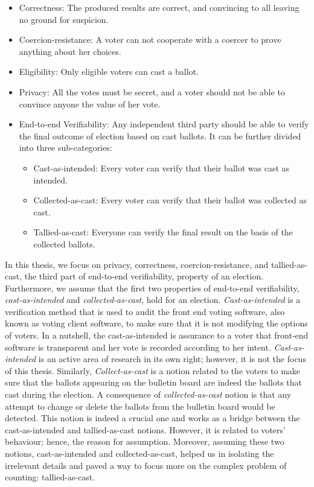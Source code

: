  \begin{itemize}
 
  \item Correctness:
 	The produced results are correct, and convincing to all leaving no  ground for suspicion. 

 \item Coercion-resistance: A voter can not cooperate with a coercer to prove anything about her choices.
 
 \item Eligibility: Only eligible voters can cast a ballot.
 	
 \item Privacy:
    All the votes must be secret, and a voter should not be able to convince anyone the 
    value of her vote.
 
 \item End-to-end Verifiability:
 Any independent third party should be able to verify the final outcome of election based on cast 
 ballots.  It can be further divided into three sub-categories:
 
 \begin{itemize}
  \item Cast-as-intended: Every voter can verify that their ballot was cast as
  intended.
  \item Collected-as-cast: Every voter can verify that their ballot was collected as
  cast.
  \item Tallied-as-cast: Everyone can verify the final result on the basis of the
  collected ballots.
\end{itemize}
\end{itemize}
	

In this thesis, we focus on privacy, correctness, coercion-resistance, and tallied-as-cast, the third part of end-to-end verifiability, property 
of an election. Furthermore, we assume that the first two properties of end-to-end verifiability, \textit{cast-as-intended} and 
\textit{collected-as-cast}, hold for an election. \textit{Cast-as-intended} is a verification method that is used to audit the 
front end voting software, 
also known as voting client software, to make sure that it is not modifying the options of voters. In a nutshell, 
the cast-as-intended is assurance to a voter that front-end software is transparent and her vote 
is recorded according to her intent.  \textit{Cast-as-intended} is an active area of research in its own right; 
however, it is not the focus of this thesis. Similarly, \textit{Collect-as-cast} is a notion related to the voters to make 
sure that the ballots appearing on the bulletin board are indeed the ballots that cast during the election. A consequence 
of \textit{collected-as-cast} notion is that any attempt to change or delete the ballots from the bulletin board would 
be detected. This notion is indeed a crucial one and works as a bridge between the cast-as-intended and tallied-as-cast 
notions. However, it is related to voters' behaviour; hence, the reason for assumption.  Moreover, assuming these two 
notions, cast-as-intended and collected-as-cast, helped us in isolating the irrelevant details and 
paved a way to focus more on the complex problem of counting: tallied-as-cast. 


